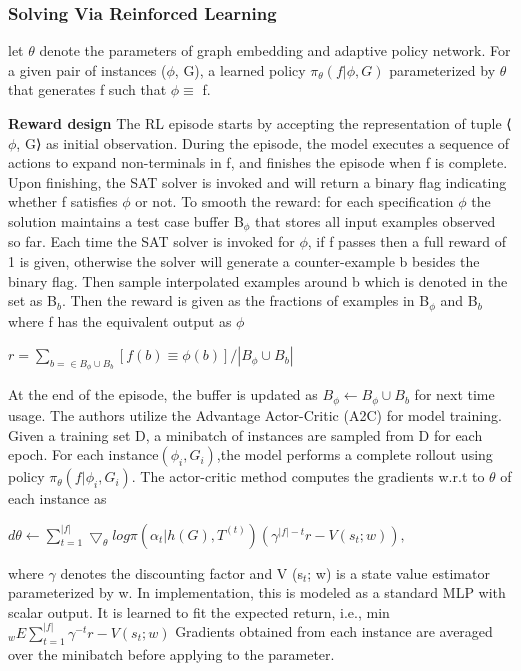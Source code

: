\documentclass{article}
\begin{document}
\subsubsection{Solving Via Reinforced Learning}
let $\theta$ denote the parameters of graph embedding and adaptive policy network. For a given pair of instances ($\phi$, G), a learned policy $\pi_\theta(f|\phi,G)$ parameterized by $\theta$ that generates f such that $\phi\equiv$ f.

\textbf{Reward design} The RL episode starts by accepting the representation of tuple ⟨$\phi$, G⟩ as initial observation. During the episode, the model executes a sequence of actions to expand non-terminals in f, and finishes the episode when f is complete. Upon finishing, the SAT solver is invoked and will return a binary flag indicating whether f satisfies $\phi$ or not. To smooth the reward: for each specification $\phi$ the solution maintains a test case buffer B$_\phi$ that stores all input examples observed so far. Each time the SAT solver is invoked for $\phi$, if f passes then a full reward of 1 is given, otherwise the solver will generate a counter-example b besides the binary flag. Then sample interpolated examples around b which is denoted in the set as B$_b$. Then the reward is given as the fractions of examples in B$_\phi$ and B$_b$ where f has the equivalent output as $\phi$

\begin{math}
r = {\sum_{b=\in B_\phi\cup B_b} [f(b) \equiv \phi(b)]}/{|B_\phi\cup B_b|}
\end{math}

At the end of the episode, the buffer is updated as $B_\phi \leftarrow B_\phi\cup B_b$ for next time usage. The authors utilize the Advantage Actor-Critic (A2C) for model training. Given a training set D, a minibatch of instances are sampled from D for each epoch. For each instance$(\phi_i,G_i)$,the model performs a complete rollout using policy $\pi_\theta(f|\phi_i,G_i)$. The actor-critic method computes the gradients w.r.t to $\theta$ of each instance as

\begin{math}
d\theta \leftarrow \sum_{t=1}^{|f|} \bigtriangledown _\theta log\pi(\alpha_t|h(G),T^{(t)})(\gamma^{|f|-t}r-V(s_t;w)),
\end{math}

where $\gamma$ denotes the discounting factor and V (s$_t$; w) is a state value estimator parameterized by w. In implementation, this is modeled as a standard MLP with scalar output. It is learned to fit the expected return, i.e., min$_w E \sum _{t=1} ^{|f|} \gamma ^{-t}r-V(s_t;w)$ Gradients obtained from each instance are averaged over the minibatch before applying to the parameter.
\end{document}

